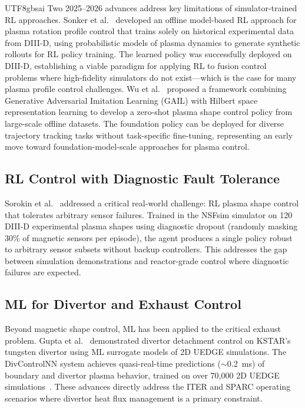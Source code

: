 \documentclass[12pt,a4paper]{article}
\begin{document}
\begin{CJK}{UTF8}{gbsai}
Two 2025--2026 advances address key limitations of simulator-trained RL approaches. Sonker et al.~\citep{Sonker2026} developed an offline model-based RL approach for plasma rotation profile control that trains solely on historical experimental data from DIII-D, using probabilistic models of plasma dynamics to generate synthetic rollouts for RL policy training. The learned policy was successfully deployed on DIII-D, establishing a viable paradigm for applying RL to fusion control problems where high-fidelity simulators do not exist---which is the case for many plasma profile control challenges. Wu et al.~\citep{Wu2025} proposed a framework combining Generative Adversarial Imitation Learning (GAIL) with Hilbert space representation learning to develop a zero-shot plasma shape control policy from large-scale offline datasets. The foundation policy can be deployed for diverse trajectory tracking tasks without task-specific fine-tuning, representing an early move toward foundation-model-scale approaches for plasma control.

\subsection{RL Control with Diagnostic Fault Tolerance}

Sorokin et al.~\citep{Sorokin2026} addressed a critical real-world challenge: RL plasma shape control that tolerates arbitrary sensor failures. Trained in the NSFsim simulator on 120 DIII-D experimental plasma shapes using diagnostic dropout (randomly masking 30\% of magnetic sensors per episode), the agent produces a single policy robust to arbitrary sensor subsets without backup controllers. This addresses the gap between simulation demonstrations and reactor-grade control where diagnostic failures are expected.

\subsection{ML for Divertor and Exhaust Control}

Beyond magnetic shape control, ML has been applied to the critical exhaust problem. Gupta et al.~\citep{Gupta2025} demonstrated divertor detachment control on KSTAR's tungsten divertor using ML surrogate models of 2D UEDGE simulations. The DivControlNN system achieves quasi-real-time predictions ($\sim$0.2~ms) of boundary and divertor plasma behavior, trained on over 70,000 2D UEDGE simulations~\citep{DivControlNN2025}. These advances directly address the ITER and SPARC operating scenarios where divertor heat flux management is a primary constraint.


\end{CJK}
\end{document}
